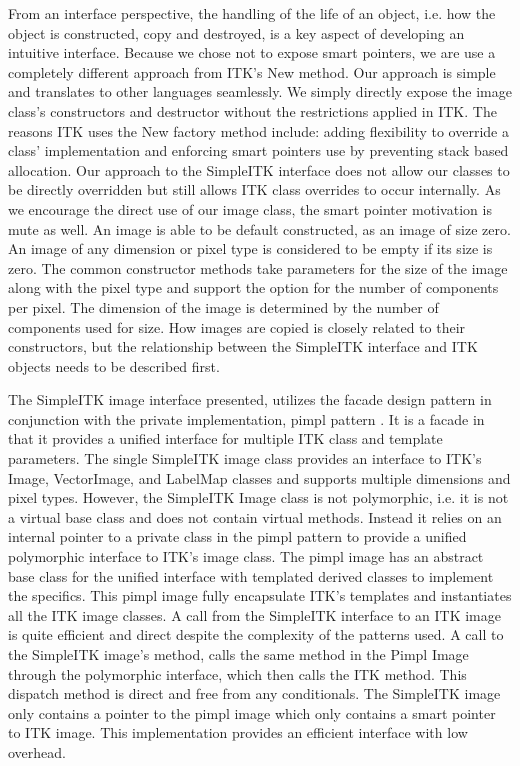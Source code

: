 \documentclass{frontiersMED} %
\begin{document}
From an interface perspective, the handling of the life of an object,
i.e. how the object is constructed, copy and destroyed, is a key
aspect of developing an intuitive interface. Because we chose not to
expose smart pointers, we are use a completely different approach from
ITK’s New method. Our approach is simple and translates to other
languages seamlessly. We simply directly expose the image class’s
constructors and destructor without the restrictions applied in
ITK. The reasons ITK uses the New factory method include: adding
flexibility to override a class’ implementation and enforcing smart
pointers use by preventing stack based allocation. Our approach to the
SimpleITK interface does not allow our classes to be directly
overridden but still allows ITK class overrides to occur
internally. As we encourage the direct use of our image class, the
smart pointer motivation is mute as well. An image is able to be
default constructed, as an image of size zero. An image of any
dimension or pixel type is considered to be empty if its size is
zero. The common constructor methods take parameters for the size of
the image along with the pixel type and support the option for the
number of components per pixel. The dimension of the image is
determined by the number of components used for size. How images are
copied is closely related to their constructors, but the relationship
between the SimpleITK interface and ITK objects needs to be described
first.

The SimpleITK image interface presented, utilizes the facade design
pattern in conjunction with the private implementation, pimpl pattern
\cite{Sutter1999}. It is a facade in that it provides a unified interface
for multiple ITK class and template parameters. The single SimpleITK
image class provides an interface to ITK’s Image, VectorImage, and
LabelMap classes and supports  multiple dimensions and pixel
types. However, the SimpleITK Image class is not polymorphic, i.e. it
is not a virtual base class and does not contain virtual
methods. Instead it relies on an internal pointer to a private class
in the pimpl pattern to provide a unified polymorphic interface to
ITK’s image class. The pimpl image has an abstract base class for the
unified interface with templated derived classes to implement the
specifics. This pimpl image fully encapsulate ITK’s templates and
instantiates all the ITK image classes. A call from the SimpleITK
interface to an ITK image is quite efficient and direct despite the
complexity of the patterns used. A call to the SimpleITK image’s
method, calls the same method in the Pimpl Image through the
polymorphic interface, which then calls the ITK method. This dispatch
method is direct and free from any conditionals. The SimpleITK image
only contains a pointer to the pimpl image which only contains a smart
pointer to ITK image. This implementation provides an efficient
interface with low overhead.
\end{document}
